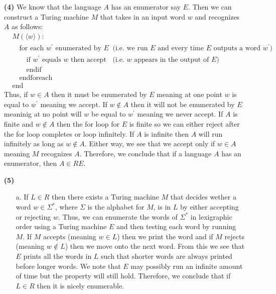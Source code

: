 \documentclass [10pt]{article}
\begin{document}
\begin{enumerate}
\begin{enumerate}
	\end{enumerate}
	\item[\textbf{(4)}]We know that the language $A$ has an enumerator say $E$. Then we can construct a Turing machine $M$ that takes in an input word $w$ and recognizes $A$ as follows:
	\begin{align}
		&\text{$M(\langle w\rangle)$:}\nonumber\\
		&\quad\text{for each $w^{\prime}$ enumerated by $E$}&&\text{(i.e. we run $E$ and every time $E$ outputs a word $w^{\prime}$)}\nonumber\\
		&\qquad\text{if $w^{\prime}$ equals $w$ then accept}&&\text{(i.e. $w$ appears in the output of $E$)}\nonumber\\
		&\qquad\text{endif}\nonumber\\
		&\quad\text{endforeach}\nonumber\\
		&\text{end}\nonumber
	\end{align}
	Thus, if $w\in A$ then it must be enumerated by $E$ meaning at one point $w$ is equal to $w^{\prime}$ meaning we accept. If $w\notin A$ then it will not be enumerated by $E$ meaninig at no point will $w$ be equal to $w^{\prime}$ meaning we never accept. If $A$ is finite and $w\notin A$ then the for loop for $E$ is finite so we can either reject after the for loop completes or loop infinitely. If $A$ is infinite then $A$ will run infinitely as long as $w\notin A$. Either way, we see that we accept only if $w\in A$ meaning $M$ recognizes $A$. Therefore, we conclude that if a language $A$ has an enumerator, then $A\in RE$.
	\item[\textbf{(5)}]
	\begin{enumerate}
		\item[a.]If $L\in R$ then there exists a Turing machine $M$ that decides wether a word $w\in\Sigma^{*}$, where $\Sigma$ is the alphabet for $M$, is in $L$ by either accepting or rejecting $w$. Thus, we can enumerate the words of $\Sigma^{*}$ in lexigraphic order using a Turing machine $E$ and then testing each word by running $M$. If $M$ accepts (meaning $w\in L$) then we print the word and if $M$ rejects (meaning $w\notin L$) then we move onto the next word. From this we see that $E$ prints all the words in $L$ such that shorter words are always printed before longer words. We note that $E$ may possibly run an infinite amount of time but the property will still hold. Therefore, we conclude that if $L\in R$ then it is nicely enumerable.

\end{enumerate}
\end{enumerate}
\end{document}
